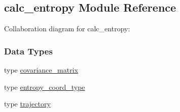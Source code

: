 \hypertarget{classcalc__entropy}{\subsection{calc\-\_\-entropy Module Reference}
\label{classcalc__entropy}
}


Collaboration diagram for calc\-\_\-entropy\-:
\subsubsection*{Data Types}
\begin{DoxyCompactItemize}
\item 
type \hyperlink{structcalc__entropy_1_1covariance__matrix}{covariance\-\_\-matrix}
\item 
type \hyperlink{structcalc__entropy_1_1entropy__coord__type}{entropy\-\_\-coord\-\_\-type}
\item 
type \hyperlink{structcalc__entropy_1_1trajectory}{trajectory}
\end{DoxyCompactItemize}

